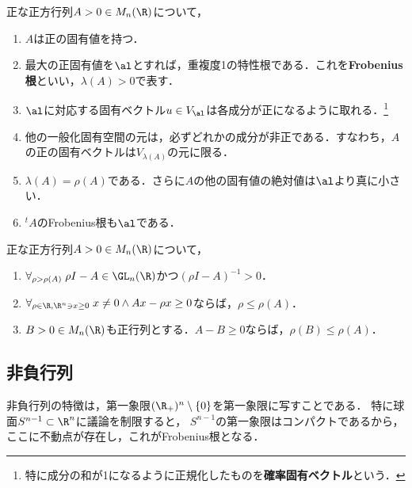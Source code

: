 \documentclass[uplatex, dvipdfmx]{jsreport}
\begin{document}
\begin{theorem}
    正な正方行列$A>0\in M_n(\R)$について，
    \begin{enumerate}
        \item $A$は正の固有値を持つ．
        \item 最大の正固有値を$\al$とすれば，重複度1の特性根である．これを\textbf{Frobenius根}といい，$\lambda(A)>0$で表す．
        \item $\al$に対応する固有ベクトル$u\in V_\al$は各成分が正になるように取れる．\footnote{特に成分の和が1になるように正規化したものを\textbf{確率固有ベクトル}という．}
        \item 他の一般化固有空間の元は，必ずどれかの成分が非正である．すなわち，$A$の正の固有ベクトルは$V_{\lambda(A)}$の元に限る．
        \item $\lambda(A)=\rho(A)$である．さらに$A$の他の固有値の絶対値は$\al$より真に小さい．
        \item ${}^t\!A$のFrobenius根も$\al$である．
    \end{enumerate}
\end{theorem}

\begin{proposition}[非負であるということが定める順序関係はスペクトル半径の大小関係に等しい]
    正な正方行列$A>0\in M_n(\R)$について，
    \begin{enumerate}
        \item $\forall_{\rho>\rho(A)}\;\rho I-A\in\GL_n(\R)$かつ$(\rho I-A)^{-1}>0$．
        \item $\forall_{\rho\in\R,\R^n\ni x\ge0}\;x\ne0\land Ax-\rho x\ge0$ならば，$\rho\le\rho(A)$．
        \item $B>0\in M_n(\R)$も正行列とする．$A-B\ge0$ならば，$\rho(B)\le\rho(A)$．
    \end{enumerate}
\end{proposition}

\subsection{非負行列}

\begin{tcolorbox}[colframe=ForestGreen, colback=ForestGreen!10!white,breakable,colbacktitle=ForestGreen!40!white,coltitle=black,fonttitle=\bfseries\sffamily,
title=]
    非負行列の特徴は，第一象限$(\R_+)^n\setminus\{0\}$を第一象限に写すことである．
    特に球面$S^{n-1}\subset\R^n$に議論を制限すると，
    $S^{n-1}$の第一象限はコンパクトであるから，ここに不動点が存在し，これがFrobenius根となる．
\end{tcolorbox}
\end{document}
